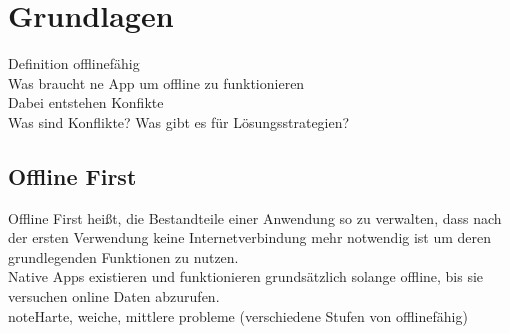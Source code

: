 \chapter{\label{chap:grundlagen}Grundlagen}
Definition offlinefähig\\
Was braucht ne App um offline zu funktionieren\\
Dabei entstehen Konfikte\\
Was sind Konflikte? Was gibt es für Lösungsstrategien?
%
%
\section{Offline First}
Offline First heißt, die Bestandteile einer Anwendung so zu verwalten, dass nach der ersten Verwendung keine Internetverbindung mehr notwendig ist um deren grundlegenden Funktionen zu nutzen.\\
Native \Glspl{App} existieren und funktionieren grundsätzlich solange offline, bis sie versuchen online Daten abzurufen.\\
note{Harte, weiche, mittlere probleme (verschiedene Stufen von offlinefähig)}\\

